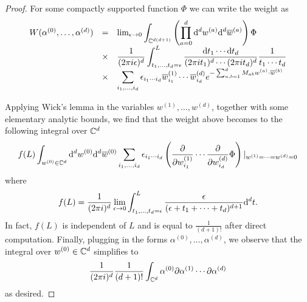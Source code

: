 \begin{proof}
For some compactly supported function $\Phi$ we can write the weight as
\[
\begin{array}{ccl}
W (\alpha^{(0)}, \ldots, \alpha^{(d)}) & = & \lim_{\epsilon \to 0} \displaystyle \int_{\mathbb C^{d(d+1)}} \left(\prod_{a = 0}^{d} {\rm d}^d w^{(a)} {\rm d}^d \overline{w}^{(a)}\right) \Phi \\ & \times & \displaystyle \frac{1}{(2 \pi i \epsilon)^d} \int_{t_1,\ldots,t_d = \epsilon}^L \frac{{\rm d} t_1 \cdots {\rm d} t_d}{(2 \pi i t_1)^d \cdots (2 \pi i t_d)^d} \frac{1}{t_1\cdots t_d} \\ & \times & \displaystyle \sum_{i_1,\ldots, i_d} \epsilon_{i_1\cdots i_d} \overline{w}_{i_1}^{(1)} \cdots \overline{w}_{i_d}^{(d)} e^{-\sum_{a,b = 1}^d M_{a b} w^{(a)} \cdot \overline{w}^{(b)}} 
\end{array}
\]

Applying Wick's lemma in the variables $w^{(1)}, \ldots, w^{(d)}$, together with some elementary analytic bounds, we find that the weight above becomes to the following integral over $\mathbb C^d$
\[
f(L) \int_{w^{(0)} \in \mathbb C^d}  {\rm d}^d w^{(0)} {\rm d}^d \overline{w}^{(0)} \sum_{i_1,\ldots, i_d} \epsilon_{i_1\cdots i_d}  
\left(\frac{\partial}{\partial w_{i_1}^{(1)}} \cdots \frac{\partial}{\partial w_{i_d}^{(d)}} \Phi\right)|_{w^{(1)}=\cdots=w^{(d)} = 0} 
\]
where
\[
f(L) = \frac{1}{(2 \pi i)^d} \lim_{\epsilon \to 0} \int_{t_1,\ldots,t_d = \epsilon}^L \frac{\epsilon}{(\epsilon + t_1 + \cdots + t_d)^{d+1}} {\rm d}^d t .
\]
In fact, $f(L)$ is independent of $L$ and is equal to $\frac{1}{(d+1)!}$ after direct computation. 
Finally, plugging in the forms $\alpha^{(0)}, \ldots, \alpha^{(d)}$, we observe that the integral over $w^{(0)} \in \mathbb C^d$ simplifies to
\[
\frac{1}{(2 \pi i)^d} \frac{1}{(d+1)!} \int_{\mathbb C^d} \alpha^{(0)} \partial \alpha^{(1)} \cdots\partial \alpha^{(d)}
\]
as desired.
\end{proof}